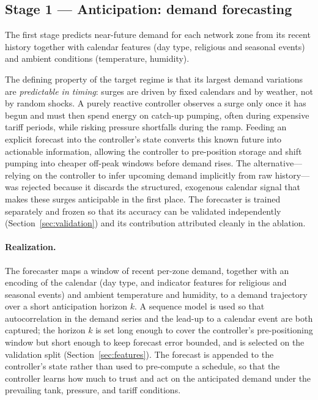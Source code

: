 \documentclass[11pt,a4paper]{article}
\begin{document}
\subsection{Stage 1 --- Anticipation: demand forecasting}
\label{sec:stage1}
The first stage predicts near-future demand for each network zone from its recent
history together with calendar features (day type, religious and seasonal events)
and ambient conditions (temperature, humidity).

The defining property of the target regime is that its
largest demand variations are \emph{predictable in timing}: surges are driven by
fixed calendars and by weather, not by random shocks. A purely reactive
controller observes a surge only once it has begun and must then spend energy on
catch-up pumping, often during expensive tariff periods, while risking pressure
shortfalls during the ramp. Feeding an explicit forecast into the controller's
state converts this known future into actionable information, allowing the
controller to pre-position storage and shift pumping into cheaper off-peak
windows before demand rises. The alternative---relying on the controller to
infer upcoming demand implicitly from raw history---was rejected because it
discards the structured, exogenous calendar signal that makes these surges
anticipable in the first place. The forecaster is trained separately and frozen
so that its accuracy can be validated independently (Section~\ref{sec:validation})
and its contribution attributed cleanly in the ablation.

\paragraph{Realization.} The forecaster maps a window of recent per-zone demand,
together with an encoding of the calendar (day type, and indicator features for
religious and seasonal events) and ambient temperature and humidity, to a demand
trajectory over a short anticipation horizon $k$. A sequence model is used so
that autocorrelation in the demand series and the lead-up to a calendar event are
both captured; the horizon $k$ is set long enough to cover the controller's
pre-positioning window but short enough to keep forecast error bounded, and is
selected on the validation split (Section~\ref{sec:features}). The forecast is
appended to the controller's state rather than used to pre-compute a schedule, so
that the controller learns how much to trust and act on the anticipated demand
under the prevailing tank, pressure, and tariff conditions.
\end{document}

